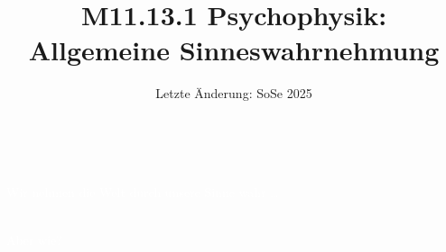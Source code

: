\documentclass[aspectratio=169]{beamer}
\title[M11.13.1 Psychophysik]{M11.13.1 Psychophysik: \\ Allgemeine Sinneswahrnehmung}
\author[melanie.stefan@medicalschool-berlin.de]{}
\institute[]{Prof. Melanie Stefan \\ melanie.stefan@medcialschool-berlin.de}
\date{Letzte Änderung: SoSe 2025}
\begin{document}
{  
\begin{frame}

 \maketitle 

$\,$\\[6cm] 


\end{frame} 
}




{  
\begin{frame}
\textcolor{white}{Wir nehmen die Welt durch unsere Sinne wahr \dots}

$\,$\\[3.5cm]


\textcolor{white}{Aber wie?}

$\,$\\[4cm]

\end{frame}
}
\end{document}
